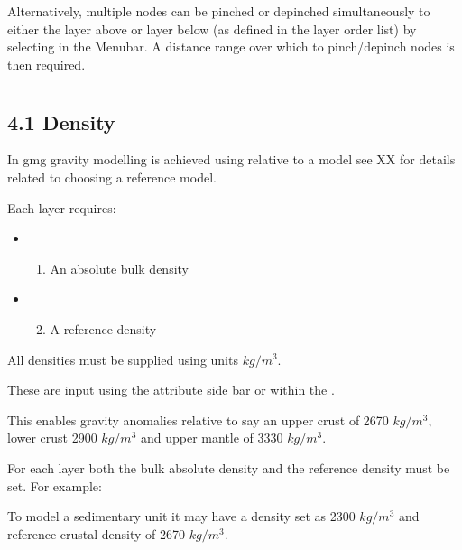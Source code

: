 \documentclass[a4paper,12pt,english]{sphinxmanual}
\begin{document}
Alternatively, multiple nodes can be pinched or depinched simultaneously to either the layer above or layer below
(as defined in the layer order list) by selecting  in the Menubar.
A distance range over which to pinch/depinch nodes is then required.


\section{}
\label{\detokenize{manual__layer_attributes:layer-attributes}}\label{\detokenize{manual__layer_attributes::doc}}

\subsection{4.1 Density}
\label{\detokenize{manual__layer_attributes:density}}
In gmg gravity modelling is achieved using  relative to a  model
see XX for details related to choosing a reference model.

Each layer requires:
\begin{itemize}
\item {} \begin{enumerate}
\item {} 
An absolute bulk density

\end{enumerate}

\item {} \begin{enumerate}
\setcounter{enumi}{1}
\item {} 
A reference density

\end{enumerate}

\end{itemize}

All densities must be supplied using units \(kg/m^3\).

These are input using the attribute side bar or within the .

This enables gravity anomalies relative to say an upper crust of 2670 \(kg/m^3\), lower crust 2900 \(kg/m^3\)
and upper mantle of 3330 \(kg/m^3\).

For each layer both the bulk absolute density and the reference density must be set. For example:

To model a sedimentary unit it may have a density set as 2300 \(kg/m^3\) and reference crustal
density of 2670 \(kg/m^3\).
\end{document}
